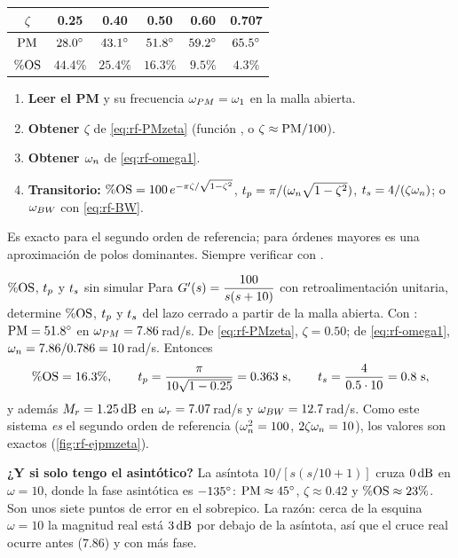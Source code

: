 \begin{center}\small
\begin{tabular}{@{}cccccc@{}}
\toprule
$\zeta$ & 0.25 & 0.40 & 0.50 & 0.60 & 0.707\\
\midrule
$\mathrm{PM}$ & $28.0^{\circ}$ & $43.1^{\circ}$ & $51.8^{\circ}$ & $59.2^{\circ}$ & $65.5^{\circ}$\\
$\%\mathrm{OS}$ & $44.4\%$ & $25.4\%$ & $16.3\%$ & $9.5\%$ & $4.3\%$\\
\bottomrule
\end{tabular}
\label{tab:rf-pmzeta}
\end{center}


\begin{receta}
\begin{enumerate}
  \item \textbf{Leer el PM} y su frecuencia $\omega_{PM}=\omega_1$ en la malla abierta.
  \item \textbf{Obtener $\zeta$} de \eqref{eq:rf-PMzeta} (función , o $\zeta\approx\mathrm{PM}/100$).
  \item \textbf{Obtener $\omega_n$} de \eqref{eq:rf-omega1}.
  \item \textbf{Transitorio:} $\%\mathrm{OS}=100\,e^{-\pi\zeta/\sqrt{1-\zeta^2}}$, $t_p=\pi/(\omega_n\sqrt{1-\zeta^2})$, $t_s=4/(\zeta\omega_n)$; o $\omega_{BW}$ con \eqref{eq:rf-BW}.
\end{enumerate}
Es exacto para el segundo orden de referencia; para órdenes mayores es una aproximación de polos dominantes. Siempre verificar con .
\end{receta}

\begin{ejemplo}[label=ej:rf-pmzeta]{$\%\mathrm{OS}$, $t_p$ y $t_s$ sin simular}
Para $G'(s)=\dfrac{100}{s(s+10)}$ con retroalimentación unitaria, determine $\%\mathrm{OS}$, $t_p$ y $t_s$ del lazo cerrado a partir de la malla abierta.
\solucion Con : $\mathrm{PM}=51.8^{\circ}$ en $\omega_{PM}=7.86$\,rad/s. De \eqref{eq:rf-PMzeta}, $\zeta=0.50$; de \eqref{eq:rf-omega1}, $\omega_n=7.86/0.786=10$\,rad/s. Entonces
\[
  \%\mathrm{OS}=16.3\%,\qquad t_p=\frac{\pi}{10\sqrt{1-0.25}}=0.363\ \text{s},\qquad t_s=\frac{4}{0.5\cdot10}=0.8\ \text{s},
\]
y además $M_r=1.25\,\mathrm{dB}$ en $\omega_r=7.07$\,rad/s y $\omega_{BW}=12.7$\,rad/s. Como este sistema \emph{es} el segundo orden de referencia ($\omega_n^2=100$, $2\zeta\omega_n=10$), los valores son exactos (\cref{fig:rf-ejpmzeta}).

\textbf{¿Y si solo tengo el asintótico?} La asíntota $10/[s(s/10+1)]$ cruza $0\,\mathrm{dB}$ en $\omega=10$, donde la fase asintótica es $-135^{\circ}$: $\mathrm{PM}\approx45^{\circ}$, $\zeta\approx0.42$ y $\%\mathrm{OS}\approx23\%$. Son unos siete puntos de error en el sobrepico. La razón: cerca de la esquina $\omega=10$ la magnitud real está $3\,\mathrm{dB}$ por debajo de la asíntota, así que el cruce real ocurre antes ($7.86$) y con más fase.
\end{ejemplo}

